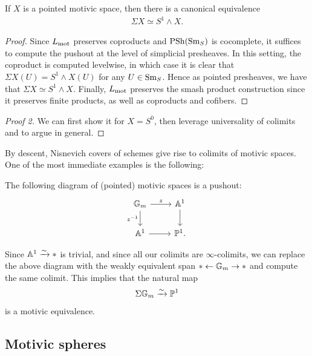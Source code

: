 \documentclass[11pt,openany]{book}
\let\smashprod\wedge
\begin{document}
\begin{proposition} If $X$ is a pointed motivic space, then there is a canonical equivalence
\begin{align*}
    \Sigma X \simeq S^1 \smashprod X.
\end{align*}
\end{proposition}
\begin{proof} Since $L_{\mathrm{mot}}$ preserves coproducts and $\mathrm{PSh}(\mathrm{Sm}_S)$ is cocomplete, it suffices to compute the pushout at the level of simplicial presheaves. In this setting, the coproduct is computed levelwise, in which case it is clear that $\Sigma X(U) = S^1 \smashprod X(U)$ for any $U \in \mathrm{Sm}_S$. Hence as pointed presheaves, we have that $\Sigma X \simeq S^1 \smashprod  X$. Finally, $L_{\mathrm{mot}}$ preserves the smash product construction since it preserves finite products, as well as coproducts and cofibers.
\end{proof}
\begin{proof}[Proof 2] We can first show it for $X = S^0$, then leverage universality of colimits and \cite[2.26]{PeterSanath} to argue in general.
\end{proof}
%

By descent, Nisnevich covers of schemes give rise to colimits of motivic spaces. One of the most immediate examples is the following:

\begin{example}\label{exa:p1-pushout} 
The following diagram of (pointed) motivic spaces is a pushout:
\[ \begin{tikzcd}
    \mathbb{G}_m\rar["z"]\dar["z^{-1}" left] & \A^1\dar\\
    \A^1\rar & \P^1.
\end{tikzcd} \]
\end{example}
Since $\mathbb{A}^1 \xrightarrow{\sim} \ast$ is trivial, and since all our colimits are $\infty$-colimits, we can replace the above diagram with the weakly equivalent span $\ast \leftarrow \mathbb{G}_m \to \ast$ and compute the same colimit. This implies that the natural map
\begin{equation}\label{eqn:suspension-gm-is-p1}
\begin{aligned}
    \Sigma \mathbb{G}_m \xrightarrow{\sim} \mathbb{P}^1
\end{aligned}
\end{equation}
is a motivic equivalence.

\subsection{Motivic spheres}
\end{document}
